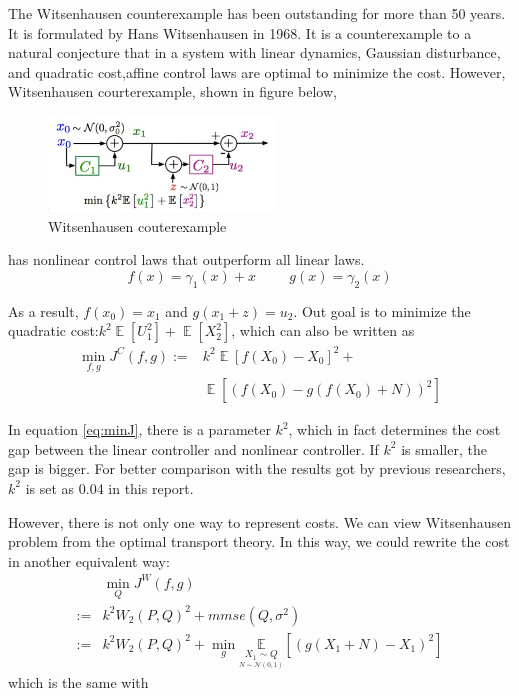 \documentclass[conference,compsoc]{IEEEtran}
\DeclareMathOperator{\E}{\mathbb{E}}
\begin{document}
The Witsenhausen counterexample has been outstanding for more than 50 years. It is formulated by Hans Witsenhausen in 1968.\cite{witsenhausen1968counterexample} It is a counterexample to a natural conjecture that in a system with linear dynamics, Gaussian disturbance, and quadratic cost,affine control laws are optimal to minimize the cost. However, Witsenhausen courterexample, shown in figure below,
\begin{figure}[htp]
    \centering
    \includegraphics[width=6cm]{images/Wits_definition.png}
    \caption{Witsenhausen couterexample}
    \label{fig:definition}
\end{figure}
has nonlinear control laws that outperform all linear laws.
\begin{equation}
    f(x)=\gamma_1(x)+x \hspace{1cm} g(x)=\gamma_2(x)
\end{equation}

As a result, $f(x_0)=x_1$ and $g(x_1+z)=u_2$. Out goal is to minimize the quadratic cost:$k^{2} \E [U_1^{2}]+\E[X_2^{2}]$, which can also be written as 
\begin{equation}\label{eq:minJ}
\begin{aligned}
\min_{f,g}J^{C}(f,g):=&k^{2}\E[f(X_0)-X_0]^{2}+\\
&\E[(f(X_0)-g(f(X_0)+N))^{2}]
\end{aligned}
\end{equation}

In equation \eqref{eq:minJ}, there is a parameter $k^2$, which in fact determines the cost gap between the linear controller and nonlinear controller\cite{baglietto2001numerical}. If $k^2$ is smaller, the gap is bigger. For better comparison with the results got by previous researchers, $k^2$ is set as 0.04 in this report.

However, there is not only one way to represent costs.\cite{wu2011witsenhausen} We can view Witsenhausen problem from the optimal transport theory. In this way, we could rewrite the cost in another equivalent way:
{
\begin{equation}\label{eq:Jw1}
  \begin{aligned}
&\min_{Q}J^{W}(f,g)\\
:=&k^{2}W_2(P,Q)^{2}+mmse(Q,\sigma^2)\\
:=&k^{2}W_2(P,Q)^{2}+\min_{g}\underset{ \underset{N \sim \mathcal{N}(0,1)}{X_1\sim Q} }{\mathbb{E}}[(g(X_1+N)-X_1)^2]
  \end{aligned}
\end{equation}
}
which is the same with
\end{document}
